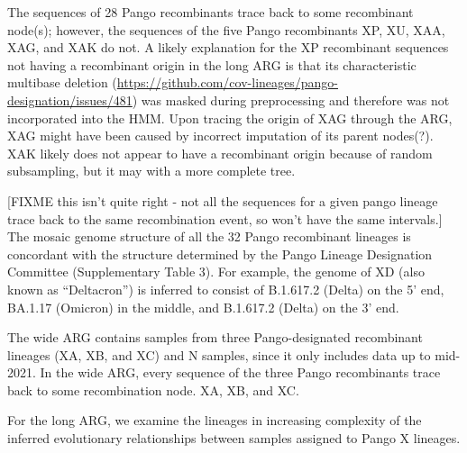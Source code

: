 \documentclass{article}
\begin{document}
The sequences of 28 Pango recombinants trace back
to some recombinant node(s); however, the sequences of the five Pango
recombinants XP, XU, XAA, XAG, and XAK do not.
A likely explanation for the XP
recombinant sequences not having a recombinant origin in the long ARG is that
its characteristic multibase deletion
(\url{https://github.com/cov-lineages/pango-designation/issues/481}) was masked
during preprocessing and therefore was not incorporated into the HMM.
Upon tracing the origin of XAG through the ARG, XAG might have been caused by
incorrect imputation of its parent nodes(?). XAK likely does not appear to have
a recombinant origin because of random subsampling, but it may with a more
complete tree.

[FIXME this isn't quite right - not all the sequences for a given pango
lineage trace back to the same recombination event, so won't have the same
intervals.]
The mosaic genome structure of all the 32 Pango recombinant lineages is concordant with
the structure determined by the Pango Lineage Designation Committee
(Supplementary Table 3). For example, the genome of XD (also known as
``Deltacron'') is inferred to consist of B.1.617.2 (Delta) on the 5’ end, BA.1.17
(Omicron) in the middle, and B.1.617.2 (Delta) on the 3’ end.

The wide ARG contains samples from three Pango-designated recombinant
lineages (XA, XB, and XC) and N samples, since it only includes data
up to mid-2021.
In the wide ARG, every sequence of the three Pango recombinants trace back to
some recombination node. XA, XB, and XC.

For the long ARG, we examine the lineages in increasing complexity of the
inferred evolutionary relationships between samples assigned to Pango
X lineages.



\end{document}
